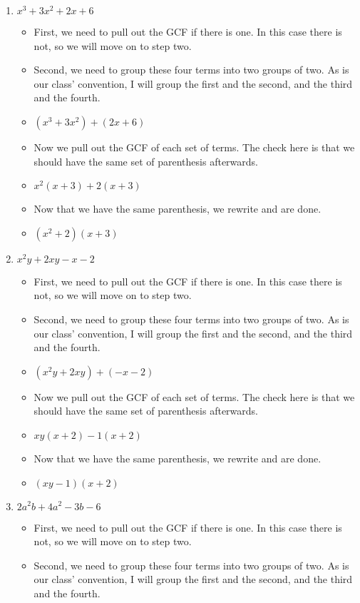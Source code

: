 \documentclass{article}
\begin{document}
\newpage
\begin{enumerate}
\item $x^{3} + 3x^{2} + 2x + 6$
  \begin{itemize}
  \item First, we need to pull out the GCF if there is one. In this case there is not, so we will move on to step two.
  \item Second, we need to group these four terms into two groups of two. As is our class' convention, I will group the first and the second, and the third and the fourth.
  \item [] $(x^{3}+3x^{2}) +(2x+6)$
  \item Now we pull out the GCF of each set of terms. The check here is that we should have the same set of parenthesis afterwards.
  \item [] $x^{2}(x+3)+2(x+3)$  
  \item Now that we have the same parenthesis, we rewrite and are done.
  \item [] $(x^{2}+2)(x+3)$
  \end{itemize}
\item $x^{2}y + 2xy - x - 2$
  \begin{itemize}
  \item First, we need to pull out the GCF if there is one. In this case there is not, so we will move on to step two.
  \item Second, we need to group these four terms into two groups of two. As is our class' convention, I will group the first and the second, and the third and the fourth.
  \item [] $(x^{2}y+2xy) +(-x-2)$
  \item Now we pull out the GCF of each set of terms. The check here is that we should have the same set of parenthesis afterwards.
  \item [] $xy(x+2)-1(x+2)$
  \item Now that we have the same parenthesis, we rewrite and are done.
  \item [] $(xy-1)(x+2)$
  \end{itemize}
\item $2a^{2}b + 4a^{2} - 3b - 6$
  \begin{itemize}
  \item First, we need to pull out the GCF if there is one. In this case there is not, so we will move on to step two.
  \item Second, we need to group these four terms into two groups of two. As is our class' convention, I will group the first and the second, and the third and the fourth.

\end{itemize}
\end{enumerate}
\end{document}
